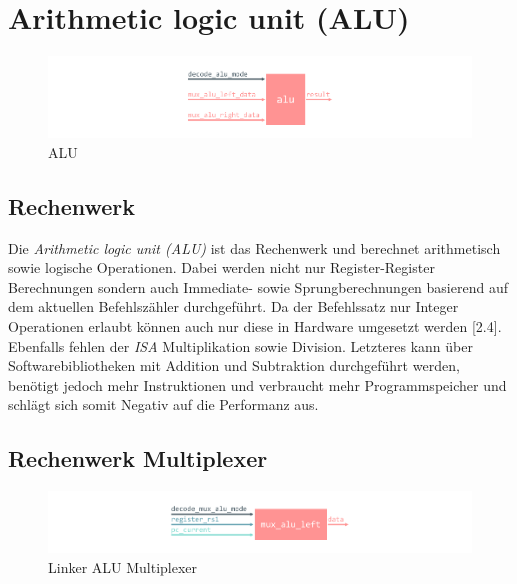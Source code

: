     \section{Arithmetic logic unit (ALU)}

        \begin{figure}[H]
            \centering
            \includegraphics[scale=1]{img/block_alu.pdf}
            \caption{ALU}
            \label{fig:alu}
        \end{figure}

        \subsection{Rechenwerk}
            Die \textit{Arithmetic logic unit (ALU)} ist das Rechenwerk und berechnet arith­me­tisch sowie logische Operationen.
            Dabei werden nicht nur Register-Register Berechnungen sondern auch Immediate- sowie Sprungberechnungen
            basierend auf dem aktuellen Befehlszähler durchgeführt.
            Da der Befehlssatz nur Integer Operationen erlaubt können auch nur diese in Hardware umgesetzt werden \cite{riscv-isa-specs}[2.4].
            Ebenfalls fehlen der \textit{ISA} Multiplikation sowie Division.
            Letzteres kann über Softwarebibliotheken mit Addition und Subtraktion durchgeführt werden,
            benötigt jedoch mehr Instruktionen und verbraucht mehr Programmspeicher und schlägt sich somit Negativ auf die Performanz aus.

        \subsection{Rechenwerk Multiplexer}

            \begin{figure}[H]
                \centering
                \includegraphics[scale=1]{img/block_mux_alu_left.pdf}
                \caption{Linker ALU Multiplexer}
                \label{fig:alu_mux_left}
            \end{figure}

